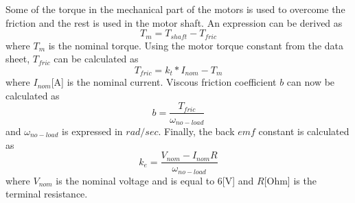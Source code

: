 Some of the torque in the mechanical part of the motors is used to overcome the friction and the rest is used in the motor shaft. An expression can be derived as
 \begin{equation*}
 T_{m} = T_{shaft} - T_{fric}
 \end{equation*}
  where $T_{m}$ is the nominal torque. Using the motor torque constant from the data sheet, $T_{fric}$ can be calculated as 
 \begin{equation*}
 T_{fric}	= k_{t}*I_{nom} - T_{m} 
 \end{equation*}    
where $I_{nom} $[A] is the nominal current. Viscous friction coefficient $b$ can now be calculated as
\begin{equation*}
	b	= \frac{T_{fric} }{\omega_{no-load}}
\end{equation*}
and $\omega_{no-load}$ is expressed in $rad/sec$. Finally, the back $emf$ constant is calculated as
\begin{equation*}
	k_{e}	= \frac{V_{nom} - I_{nom}R}{\omega_{no-load}}
\end{equation*}
where $V_{nom}$ is the nominal voltage and is equal to 6[V] and  $R$[Ohm] is the terminal resistance. 